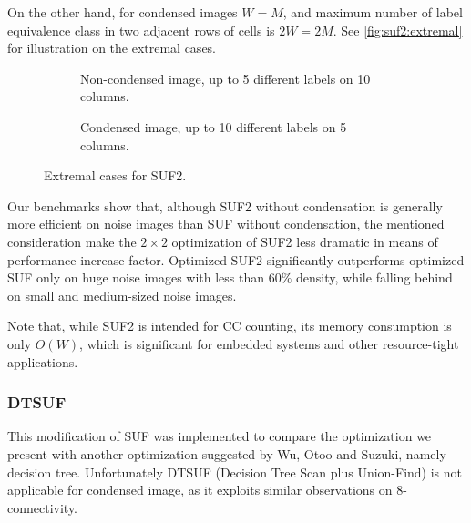 \documentclass[hidelinks]{llncs}
\begin{document}
On the other hand, for condensed images $W=M$, and maximum number of label
equivalence class in two adjacent rows of cells is $2W=2M$. See
\autoref{fig:suf2:extremal} for illustration on the extremal cases.

\begin{figure}
  \centering
  \begin{subfigure}{0.475\linewidth}
    \centering
    \caption{Non-condensed image, up to 5 different labels on 10 columns.}
  \end{subfigure}
  \quad
  \begin{subfigure}{0.475\linewidth}
    \centering
    \caption{Condensed image, up to 10 different labels on 5 columns.}
  \end{subfigure}
  \caption{Extremal cases for SUF2.}
  \label{fig:suf2:extremal}
\end{figure}

Our benchmarks show that, although SUF2 without condensation is generally more
efficient on noise images than SUF without condensation, the mentioned
consideration make the $2 \times 2$ optimization of SUF2 less dramatic in means
of performance increase factor. Optimized SUF2 significantly outperforms
optimized SUF only on huge noise images with less than $60\%$ density, while
falling behind on small and medium-sized noise images.

Note that, while SUF2 is intended for CC counting, its memory consumption is
only $O(W)$, which is significant for embedded systems and other resource-tight
applications.

\subsubsection{DTSUF}

This modification of SUF was implemented to compare the optimization we present
with another optimization suggested by Wu, Otoo and Suzuki\cite{wuotoo}, namely
decision tree. Unfortunately DTSUF (Decision Tree Scan plus Union-Find) is not
applicable for condensed image, as it exploits similar observations on
8-connectivity.
\end{document}
